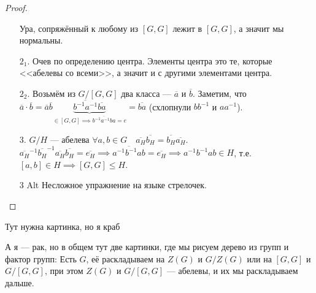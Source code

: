 \begin{proof}
\begin{enumerate}
\begin{enumerate}
	   \end{enumerate}
	   Ура, сопряжённый к любому из $[G, G]$ лежит в $[G, G]$, а значит мы нормальны.
   \item[$2_1$.] Очев по определению центра. Элементы центра это те, которые <<абелевы со всеми>>, а значит и с другими элементами центра.
   \item[$2_2$.] Возьмём из $G / [G, G]$ два класса --- $\overline{a}$ и $\overline{b}$. Заметим, что $\overline{a} \cdot \overline{b} = \overline{a}\overline{b}\underbrace{\overline{b^{-1}a^{-1}}\overline{ba}}_{\in [G, G] \implies \overline{b^{-1} a^{-1} ba} = e} = \overline{ba}$ (схлопнули $b b^{-1}$ и $a a^{-1}$).
         \item[3.] $G / H$ --- абелева  $\forall a, b \in G\quad \overline{a_H} \overline{b_H} = \overline{b_H}\overline{a_H}$.  $\overline{a_H}^{-1}\overline{b_H}^{-1} \overline{a_H}\overline{b_H} = \overline{e_H} \implies \overline{a^{-1} b^{-1}ab} = \overline{e_H} \implies a^{-1}b^{-1}ab \in H$, т.е. $[a, b] \in H \implies [G, G] \le H$.
         \item[3 Alt] Несложное упражнение на языке стрелочек.
    \end{enumerate}
\end{proof}

Тут нужна картинка, но я краб

А я --- рак, но в общем тут две картинки, где мы рисуем дерево из групп и фактор групп: Есть $G$, её раскладываем на $Z(G)$ и $G / Z(G)$ или на $[G, G]$ и $G / [G, G]$, при этом $Z(G)$ и $G/[G, G]$ --- абелевы, и их мы раскладываем дальше.

